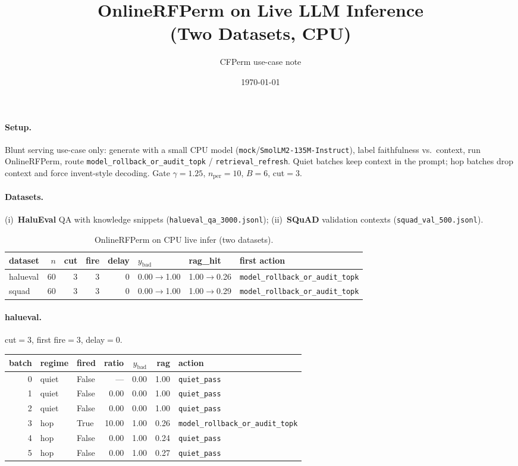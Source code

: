 \documentclass[11pt]{article}
\title{OnlineRFPerm on Live LLM Inference\\(Two Datasets, CPU)}
\author{CFPerm use-case note}
\date{\today}
\begin{document}
\maketitle

\paragraph{Setup.}
Blunt serving use-case only: generate with a small CPU model (\texttt{mock}/\texttt{SmolLM2-135M-Instruct}), label faithfulness vs.\ context, run OnlineRFPerm, route \texttt{model\_rollback\_or\_audit\_topk} / \texttt{retrieval\_refresh}. Quiet batches keep context in the prompt; hop batches drop context and force invent-style decoding. Gate $\gamma=1.25$, $n_{\mathrm{per}}=10$, $B=6$, cut$=3$.

\paragraph{Datasets.}
(i)~\textbf{HaluEval} QA with knowledge snippets (\texttt{halueval\_qa\_3000.jsonl}); (ii)~\textbf{SQuAD} validation contexts (\texttt{squad\_val\_500.jsonl}).

\begin{table}[h]
\centering
\caption{OnlineRFPerm on CPU live infer (two datasets).}
\begin{tabular}{lrrrrlll}
\toprule
dataset & $n$ & cut & fire & delay & $y_{\mathrm{bad}}$ & rag\_hit & first action \\
\midrule
halueval & 60 & 3 & 3 & 0 & 0.00$\to$1.00 & 1.00$\to$0.26 & \texttt{model\_rollback\_or\_audit\_topk} \\
squad & 60 & 3 & 3 & 0 & 0.00$\to$1.00 & 1.00$\to$0.29 & \texttt{model\_rollback\_or\_audit\_topk} \\
\bottomrule
\end{tabular}
\end{table}

\paragraph{halueval.} cut$=3$, first fire$=3$, delay$=0$.
\begin{center}\small
\begin{tabular}{rllrrrl}
\toprule batch & regime & fired & ratio & $y_{\mathrm{bad}}$ & rag & action \\ \midrule
0 & quiet & False & --- & 0.00 & 1.00 & \texttt{quiet\_pass} \\
1 & quiet & False & 0.00 & 0.00 & 1.00 & \texttt{quiet\_pass} \\
2 & quiet & False & 0.00 & 0.00 & 1.00 & \texttt{quiet\_pass} \\
3 & hop & True & 10.00 & 1.00 & 0.26 & \texttt{model\_rollback\_or\_audit\_topk} \\
4 & hop & False & 0.00 & 1.00 & 0.24 & \texttt{quiet\_pass} \\
5 & hop & False & 0.00 & 1.00 & 0.27 & \texttt{quiet\_pass} \\
\bottomrule\end{tabular}\end{center}
\end{document}
